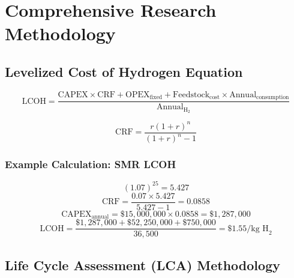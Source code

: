 \documentclass[12pt,twoside,openany]{book}
\begin{document}

\chapter{Comprehensive Research Methodology}

\section{Levelized Cost of Hydrogen Equation}

\begin{dmath}
\boxed{\text{LCOH} = \frac{\text{CAPEX} \times \text{CRF}
    + \text{OPEX}_{\text{fixed}}
    + \text{Feedstock}_{\text{cost}} \times \text{Annual}_{\text{consumption}}}
    {\text{Annual}_{\text{H}_2}}}
\end{dmath}

\begin{dmath}
\boxed{\text{CRF} = \frac{r(1+r)^n}{(1+r)^n - 1}}
\end{dmath}

\subsection{Example Calculation: SMR LCOH}

\begin{dmath}
(1.07)^{25} = 5.427
\end{dmath}
\begin{dmath}
\text{CRF} = \frac{0.07 \times 5.427}{5.427 - 1} = 0.0858
\end{dmath}
\begin{dmath}
\text{CAPEX}_{\text{annual}} = \$15{,}000{,}000 \times 0.0858 = \$1{,}287{,}000
\end{dmath}
\begin{dmath}
\text{LCOH} = \frac{\$1{,}287{,}000 + \$52{,}250{,}000 + \$750{,}000}{36{,}500}
            = \$1.55/\text{kg H}_2
\end{dmath}

\section{Life Cycle Assessment (LCA) Methodology}
\end{document}
